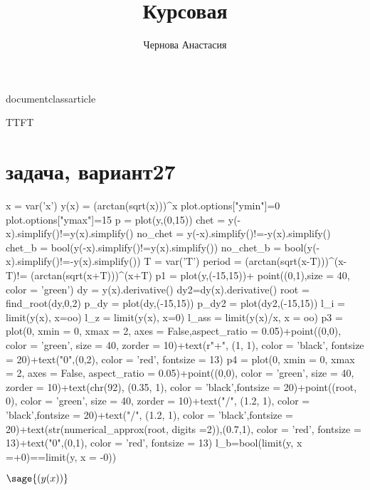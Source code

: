 documentclass{article}
\usepackage{ifxetex,ifluatex}
\usepackage[utf8]{inputenc}
\usepackage[english, russian]{babel}
\usepackage[T1, T2A]{fontenc}
\if\ifxetex T\else\ifluatex T\else F\fi\fi T%
  \usepackage{fontspec}
\else
  \usepackage[T1]{fontenc}
  \usepackage[utf8]{inputenc}
  \usepackage{lmodern}
\fi

\usepackage{hyperref}

\title{Курсовая}
\author{Чернова Анастасия}


\usepackage{sagetex}


\maketitle
\newpage
\section{задача, вариант27}
\begin {sagesilent}
x = var('x')
y(x) = (arctan(sqrt(x)))^x
plot.options["ymin"]=0
plot.options["ymax"]=15
p = plot(y,(0,15))
chet = y(-x).simplify()!=y(x).simplify()
no_chet = y(-x).simplify()!=-y(x).simplify()
chet_b = bool(y(-x).simplify()!=y(x).simplify())
no_chet_b = bool(y(-x).simplify()!=-y(x).simplify())
T = var('T')
period = (arctan(sqrt(x-T)))^(x-T)!= (arctan(sqrt(x+T)))^(x+T)
p1 = plot(y,(-15,15))+ point((0,1),size = 40, color = 'green')
dy = y(x).derivative()
dy2=dy(x).derivative()
root = find_root(dy,0,2)
p_dy = plot(dy,(-15,15))
p_dy2 = plot(dy2,(-15,15))
l_i = limit(y(x), x=oo)
l_z = limit(y(x), x=0)
l_ass = limit(y(x)/x, x = oo)
p3 = plot(0, xmin = 0, xmax = 2, axes = False,aspect_ratio = 0.05)+point((0,0), color = 'green', size = 40, zorder = 10)+text(r"+", (1, 1), color = 'black', fontsize = 20)+text("0",(0,2), color = 'red', fontsize = 13)
p4 = plot(0, xmin = 0, xmax = 2, axes = False, aspect_ratio = 0.05)+point((0,0), color = 'green', size = 40, zorder = 10)+text(chr(92), (0.35, 1), color = 'black',fontsize = 20)+point((root, 0), color = 'green', size = 40, zorder = 10)+text("/", (1.2, 1), color = 'black',fontsize = 20)+text("/", (1.2, 1), color = 'black',fontsize = 20)+text(str(numerical_approx(root, digits =2)),(0.7,1), color = 'red', fontsize = 13)+text("0",(0,1), color = 'red', fontsize = 13)
l_b=bool(limit(y, x =+0)==limit(y, x = -0))
\end{sagesilent}
\large $\sage{(y(x))}$

